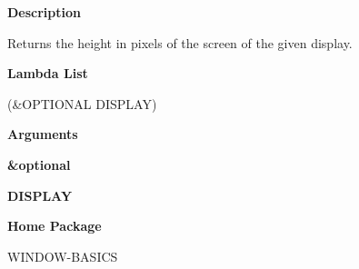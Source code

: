  
{\bf Description}

Returns the height in pixels of the screen of the given display.

 
{\bf Lambda List}

(\&OPTIONAL DISPLAY)

 
{\bf Arguments}


\beginhang
{\bf \&optional}\hspace{2em}
 
{\bf DISPLAY}


 
\endhang
 
{\bf Home Package}

WINDOW-BASICS

